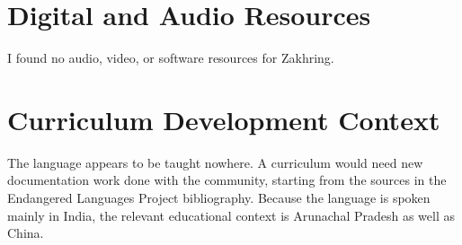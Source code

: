 \documentclass[12pt]{article}
\begin{document}
\section{Digital and Audio Resources}
I found no audio, video, or software resources for Zakhring.

\section{Curriculum Development Context}
The language appears to be taught nowhere. A curriculum would need new documentation work done with the community, starting from the sources in the Endangered Languages Project bibliography. Because the language is spoken mainly in India, the relevant educational context is Arunachal Pradesh as well as China.
\end{document}
